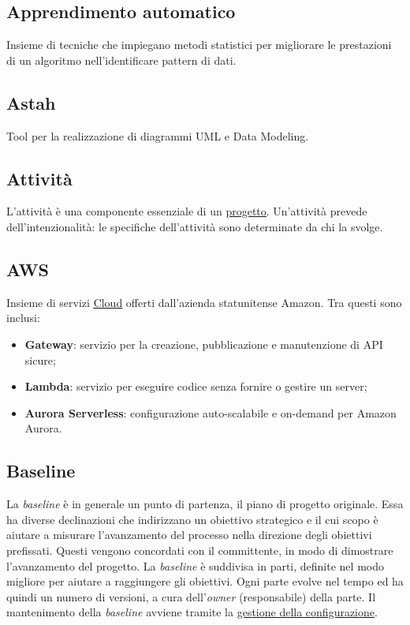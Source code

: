 	\subsection{Apprendimento automatico}
	\label{sec:app-auto}
	Insieme di tecniche che impiegano metodi statistici per migliorare le prestazioni di un algoritmo nell'identificare pattern di dati.

	\subsection{Astah}
	\label{sec:astah}
	Tool per la realizzazione di diagrammi UML e Data Modeling.	
	
	\subsection{Attività}
	\label{sec:attivita}
	L'attività è una componente essenziale di un \underline{\hyperref[sec:progetto]{progetto}}. Un'attività prevede dell'intenzionalità: le specifiche dell'attività sono determinate da chi la svolge.

	\subsection{AWS}
	\label{sec:aws}
	Insieme di servizi \underline{\hyperref[sec:cloud]{Cloud}} offerti dall'azienda statunitense Amazon. Tra questi sono inclusi:
	\begin{itemize}
		\item \textbf{Gateway}: servizio per la creazione, pubblicazione e manutenzione di API sicure;
		\item \textbf{Lambda}: servizio per eseguire codice senza fornire o gestire un server;
		\item \textbf{Aurora Serverless}: configurazione auto-scalabile e on-demand per Amazon Aurora.
	\end{itemize}

	\newpage
	\subsection{Baseline}
	\label{sec:baseline}
	La \emph{baseline} è in generale un punto di partenza, il piano di progetto originale. Essa ha diverse declinazioni che indirizzano un obiettivo strategico e il cui scopo è aiutare a misurare l'avanzamento del processo nella direzione degli obiettivi prefissati. Questi vengono concordati con il committente, in modo di dimostrare l'avanzamento del progetto. La  \emph{baseline} è suddivisa in parti, definite nel modo migliore per aiutare a raggiungere gli obiettivi. Ogni parte evolve nel tempo ed ha quindi un numero di versioni, a cura dell'\emph{owner} (responsabile) della parte. Il mantenimento della  \emph{baseline} avviene tramite la \underline{\hyperref[sec:controlloconfigurazione]{gestione della configurazione}}.

